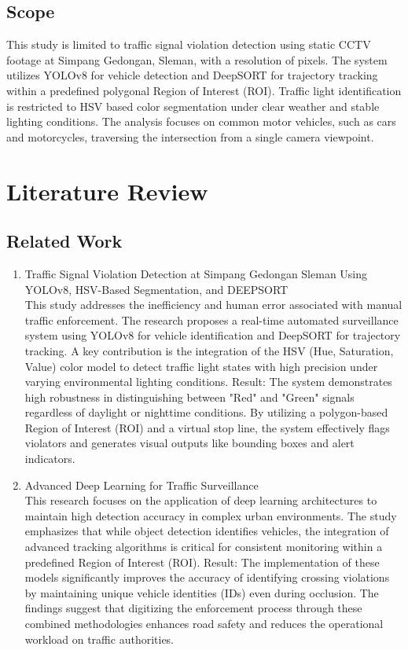 \documentclass[conference]{IEEEtran}
\begin{document}
\subsection{Scope}
This study is limited to traffic signal violation detection using static CCTV footage at Simpang Gedongan, Sleman, with a resolution of pixels. The system utilizes YOLOv8 for vehicle detection and DeepSORT for trajectory tracking within a predefined polygonal Region of Interest (ROI). Traffic light identification is restricted to HSV based color segmentation under clear weather and stable lighting conditions. The analysis focuses on common motor vehicles, such as cars and motorcycles, traversing the intersection from a single camera viewpoint.
\section{Literature Review}
\subsection{Related Work}
\begin{enumerate}
    \item{Traffic Signal Violation Detection at Simpang Gedongan Sleman Using YOLOv8, HSV-Based Segmentation, and DEEPSORT} \\
    This study addresses the inefficiency and human error associated with manual traffic enforcement. The research proposes a real-time automated surveillance system using YOLOv8 for vehicle identification and DeepSORT for trajectory tracking. A key contribution is the integration of the HSV (Hue, Saturation, Value) color model to detect traffic light states with high precision under varying environmental lighting conditions. 
    {Result:} The system demonstrates high robustness in distinguishing between "Red" and "Green" signals regardless of daylight or nighttime conditions. By utilizing a polygon-based Region of Interest (ROI) and a virtual stop line, the system effectively flags violators and generates visual outputs like bounding boxes and alert indicators.

    \item{Advanced Deep Learning for Traffic Surveillance} \\
    This research focuses on the application of deep learning architectures to maintain high detection accuracy in complex urban environments. The study emphasizes that while object detection identifies vehicles, the integration of advanced tracking algorithms is critical for consistent monitoring within a predefined Region of Interest (ROI).
    {Result:} The implementation of these models significantly improves the accuracy of identifying crossing violations by maintaining unique vehicle identities (IDs) even during occlusion. The findings suggest that digitizing the enforcement process through these combined methodologies enhances road safety and reduces the operational workload on traffic authorities.
\end{enumerate}
\end{document}
